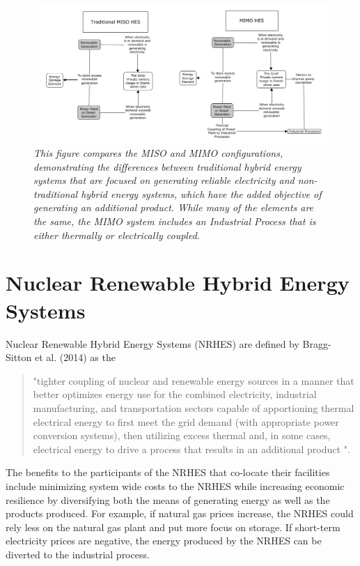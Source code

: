 \documentclass[12pt]{UIdahoMastersThesis}
\begin{document}
\begin{figure}
\includegraphics[width=\textwidth]{MISO_MIMO.png}
\caption{\small \sl This figure compares the MISO and MIMO configurations, demonstrating the differences between traditional hybrid energy systems that are focused on generating reliable electricity and non-traditional hybrid energy systems, which have the added objective of generating an additional product.  While many of the elements are the same, the MIMO system includes an Industrial Process  that is either thermally or electrically coupled.}
\end{figure}

\section{Nuclear Renewable Hybrid Energy Systems}
Nuclear Renewable Hybrid Energy Systems (NRHES) are defined by Bragg-Sitton et al. (2014) as the 

\begin{quotation}
"tighter coupling of nuclear and renewable energy sources in a manner that better optimizes energy use for the combined electricity, industrial manufacturing, and transportation sectors capable of apportioning thermal electrical energy to first meet the grid demand (with appropriate power conversion systems), then utilizing excess thermal and, in some cases, electrical energy to drive a process that results in an additional product \cite {Bragg-Sitton2014}".
\end{quotation}

The benefits to the participants of the NRHES that co-locate their facilities include minimizing system wide costs to the NRHES while increasing economic resilience by diversifying both the means of generating energy as well as the products produced. For example, if natural gas prices increase, the NRHES could rely less on the natural gas plant and put more focus on storage.  If short-term electricity prices are negative, the energy produced by the NRHES can be diverted to the industrial process.  
\end{document}
